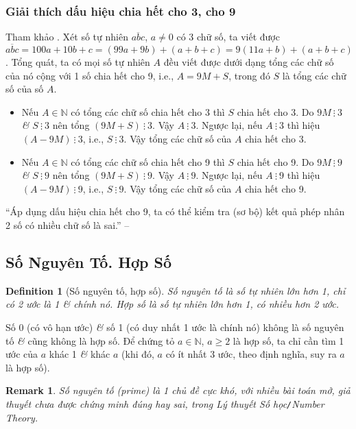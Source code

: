 \documentclass{article}
\numberwithin{equation}{section}
\newtheorem{definition}{Definition}[section]
\newtheorem{remark}{Remark}[section]
\begin{document}
\subsubsection{Giải thích dấu hiệu chia hết cho 3, cho 9}
Tham khảo \cite[p. 40]{Thai_Anh_Dat_Ha_Loan_Nam_Quang_Toan_6_tap_1}. Xét số tự nhiên $\overline{abc}$, $a\ne 0$ có 3 chữ số, ta viết được $\overline{abc} = 100a + 10b + c = (99a + 9b) + (a + b + c) = 9(11a + b) + (a + b + c)$. Tổng quát, ta có mọi số tự nhiên $A$ đều viết được dưới dạng tổng các chữ số của nó cộng với 1 số chia hết cho 9, i.e., $A = 9M + S$, trong đó $S$ là tổng các chữ số của số $A$.
\begin{itemize}
	\item Nếu $A\in\mathbb{N}$ có tổng các chữ số chia hết cho 3 thì $S$ chia hết cho 3. Do $9M\ \vdots\ 3$ \textit{\&} $S\ \vdots\ 3$ nên tổng $(9M + S)\ \vdots\ 3$. Vậy $A\ \vdots\ 3$. Ngược lại, nếu $A\ \vdots\ 3$ thì hiệu $(A - 9M)\ \vdots\ 3$, i.e., $S\ \vdots\ 3$. Vậy tổng các chữ số của $A$ chia hết cho 3.
	\item Nếu $A\in\mathbb{N}$ có tổng các chữ số chia hết cho 9 thì $S$ chia hết cho 9. Do $9M\ \vdots\ 9$ \textit{\&} $S\ \vdots\ 9$ nên tổng $(9M + S)\ \vdots\ 9$. Vậy $A\ \vdots\ 9$. Ngược lại, nếu $A\ \vdots\ 9$  thì hiệu $(A - 9M)\ \vdots\ 9$, i.e., $S\ \vdots\ 9$. Vậy tổng các chữ số của $A$ chia hết cho 9.
\end{itemize}
``Áp dụng dấu hiệu chia hết cho 9, ta có thể kiểm tra (sơ bộ) kết quả phép nhân 2 số có nhiều chữ số là sai.'' -- \cite[p. 40]{Thai_Anh_Dat_Ha_Loan_Nam_Quang_Toan_6_tap_1}

\subsection{Số Nguyên Tố. Hợp Số}

\begin{definition}[Số nguyên tố, hợp số]
	\emph{Số nguyên tố} là số tự nhiên lớn hơn 1, chỉ có 2 ước là 1 \textit{\&} chính nó. \emph{Hợp số} là số tự nhiên lớn hơn 1, có nhiều hơn 2 ước.
\end{definition}
Số 0 (có vô hạn ước) \textit{\&} số 1 (có duy nhất 1 ước là chính nó) không là số nguyên tố \textit{\&} cũng không là hợp số. Để chứng tỏ $a\in\mathbb{N}$, $a\ge 2$ là hợp số, ta chỉ cần tìm 1 ước của $a$ khác 1 \textit{\&} khác $a$ (khi đó, $a$ có ít nhất 3 ước, theo định nghĩa, suy ra $a$ là hợp số).

\begin{remark}
	Số nguyên tố (prime) là 1 chủ đề cực khó, với nhiều bài toán mở, giả thuyết chưa được chứng minh đúng hay sai, trong Lý thuyết Số học\emph{\texttt{/}}Number Theory.
\end{remark}
\end{document}

